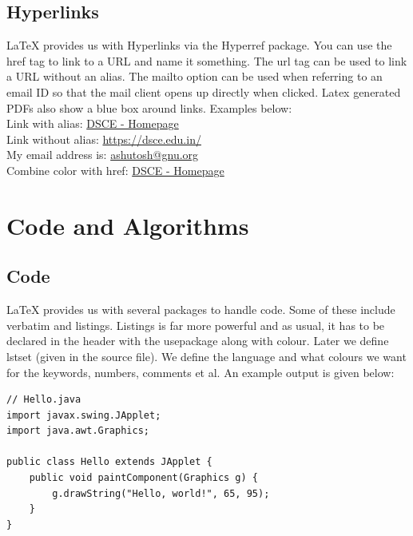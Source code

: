 \documentclass[ 12pt,a4paper,twocolumn,fleqn]{article}
\begin{document}
\subsection{Hyperlinks}
\LaTeX{} provides us with Hyperlinks via the Hyperref package. You can use the href tag to link to a URL and name it something. The url tag can be used to link a URL without an alias. The mailto option can be used when referring to an email ID so that the mail client opens up directly when clicked. Latex generated PDFs also show a blue box around links. Examples below: \\
Link with alias: \href{https://dsce.edu.in/}{DSCE - Homepage} \\
Link without alias: \url{https://dsce.edu.in/} \\
My email address is: \href{mailto:ashutosh@gnu.org}{ashutosh@gnu.org} \\
Combine color with href: \textcolor{blue}{\href{https://dsce.edu.in/}{DSCE - Homepage}} \\
\section{Code and Algorithms}
\subsection{Code}
\LaTeX{} provides us with several packages to handle code. Some of these include verbatim and listings. Listings is far more powerful and as usual, it has to be declared in the header with the usepackage along with colour. Later we define lstset (given in the source file). We define the language and what colours we want for the keywords, numbers, comments et al. An example output is given below: \\

\begin{lstlisting}
// Hello.java
import javax.swing.JApplet;
import java.awt.Graphics;

public class Hello extends JApplet {
    public void paintComponent(Graphics g) {
        g.drawString("Hello, world!", 65, 95);
    }    
}
\end{lstlisting}
\newpage
  \pagestyle{fancy}
\thisfancypage{%
  \setlength{\fboxsep}{20pt}\doublebox}{}
\end{document}
